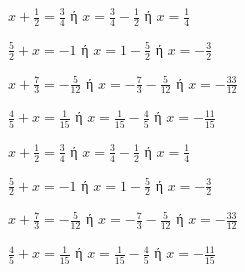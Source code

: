 \begin{alist}
\item $ x+\frac{1}{2}=\frac{3}{4} $ ή $ x=\frac{3}{4}-\frac{1}{2} $ ή $ x=\frac{1}{4} $
\item $ \frac{5}{2}+x=-1 $ ή $ x=1-\frac{5}{2} $ ή $ x=-\frac{3}{2} $
\item $ x+\frac{7}{3}=-\frac{5}{12} $ ή $ x=-\frac{7}{3}-\frac{5}{12} $ ή $ x=-\frac{33}{12} $
\item $ \frac{4}{5}+x=\frac{1}{15} $ ή $ x=\frac{1}{15}-\frac{4}{5} $ ή $ x=-\frac{11}{15} $
\end{alist}
\begin{alist}
\item $ x+\frac{1}{2}=\frac{3}{4} $ ή $ x=\frac{3}{4}-\frac{1}{2} $ ή $ x=\frac{1}{4} $
\item $ \frac{5}{2}+x=-1 $ ή $ x=1-\frac{5}{2} $ ή $ x=-\frac{3}{2} $
\item $ x+\frac{7}{3}=-\frac{5}{12} $ ή $ x=-\frac{7}{3}-\frac{5}{12} $ ή $ x=-\frac{33}{12} $
\item $ \frac{4}{5}+x=\frac{1}{15} $ ή $ x=\frac{1}{15}-\frac{4}{5} $ ή $ x=-\frac{11}{15} $
\end{alist}
